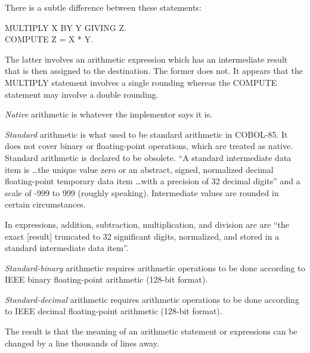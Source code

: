 \documentclass{article}
\begin{document}
There is a subtle difference between these statements:
\begin{tabbing}
MULTIPLY X BY Y GIVING Z.\\
COMPUTE Z = X * Y.
\end{tabbing}
The latter involves an arithmetic expression which has an
intermediate result that is then assigned to the destination.
The former does not.  It appears that the MULTIPLY statement
involves a single rounding whereas the COMPUTE statement may
involve a double rounding.

{\it Native} arithmetic is whatever the implementor says it is.

{\it Standard} arithmetic is what used to be standard arithmetic in
COBOL-85.  It does not cover binary or floating-point operations,
which are treated as native.  Standard arithmetic is declared to
be obsolete.  ``A standard intermediate data item is \dots the
unique value zero or an abstract, signed, normalized decimal
floating-point temporary data item \dots with a precision of
32 decimal digits'' and a scale of -999 to 999 (roughly speaking).
Intermediate values are rounded in certain circumstances.

In expressions,
addition, subtraction, multiplication, and
division are are ``the exact [result] truncated
to 32 significant digits, normalized, and stored in a standard
intermediate data item''.

{\it Standard-binary} arithmetic requires arithmetic operations
to be done according to IEEE binary floating-point
arithmetic (128-bit format).

{\it Standard-decimal} arithmetic requires arithmetic operations
to be done according to IEEE decimal floating-point arithmetic
(128-bit format).

The result is that the meaning of an arithmetic statement or
expressions can be changed by a line thousands of lines away.
\end{document}
